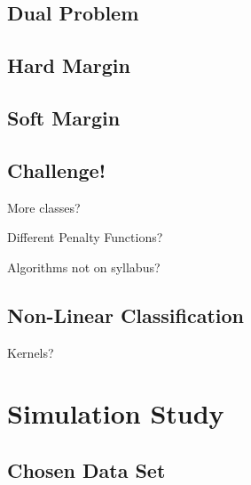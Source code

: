 \documentclass[10pt, a4paper,reqno]{amsart}
\begin{document}
\subsection{Dual Problem}













%

\subsection{Hard Margin}

\subsection{Soft Margin}

\subsection{Challenge!}\hfill

More classes?

Different Penalty Functions?

Algorithms not on syllabus?

\subsection{Non-Linear Classification}\hfill

Kernels?


\section{Simulation Study}

\subsection{Chosen Data Set}\hfill
\end{document}
